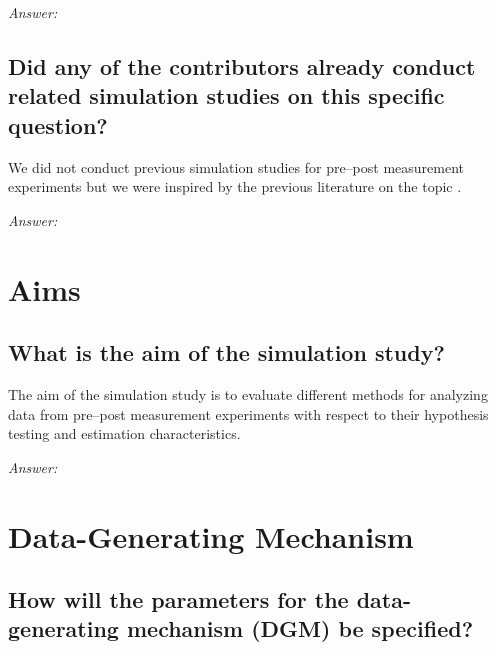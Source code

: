 \documentclass[12pt]{article}
\begin{document}
\textit{Answer:}

\subsection{Did any of the contributors already conduct related simulation studies on this specific question?}


\begin{examplebox}
    We did not conduct previous simulation studies for pre--post measurement experiments but we were inspired by the previous literature on the topic \parencite{vickers2001use, senn2006change, van2013ancova, clifton2019correlation, ludtke2023ancova}.
\end{examplebox}

\textit{Answer:}

\section{Aims}
\subsection{What is the aim of the simulation study?}
 
    
\begin{examplebox}
The aim of the simulation study is to evaluate different methods for analyzing data from pre--post measurement experiments with respect to their hypothesis testing and estimation characteristics.
\end{examplebox}

\textit{Answer:}


\section{Data-Generating Mechanism}
\subsection{How will the parameters for the data-generating mechanism (DGM) be specified?}
\end{document}
